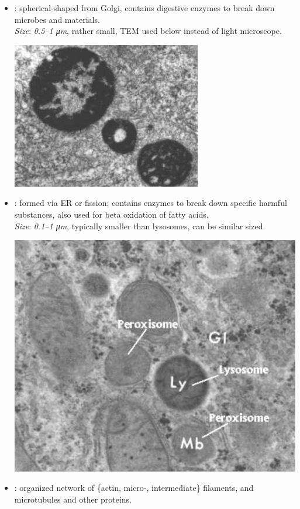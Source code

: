 \begin{multicols}{2}
\begin{itemize}
\begin{center}
  \end{center}
  \item {}: spherical-shaped from Golgi, contains digestive enzymes to break down microbes and materials.\\
  \textit{Size}: \emph{0.5--1 \si{\micro m}}, rather small, TEM used below instead of light microscope.
  \begin{center}
    \hspace{-30pt}\includegraphics[width=0.69\columnwidth]{images/week-1-lysosome.png}
  \end{center}
  \item {}: formed via ER or fission; contains enzymes to break down specific harmful substances, also used for beta oxidation of fatty acids. \\
  \textit{Size}: \emph{0.1--1 \si{\micro m}}, typically smaller than lysosomes, can be similar sized.
  \begin{center}
    \hspace{-30pt}\includegraphics[width=0.69\columnwidth]{images/week-1-peroxisome.png}
  \end{center}
  \item {}: organized network of \{actin, micro-, intermediate\} filaments, and microtubules and other proteins.\\

\end{itemize}
\end{multicols}

